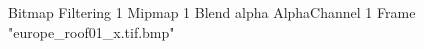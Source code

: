 {Bitmap
	{Filtering 1}
	{Mipmap 1}
	{Blend alpha}
	{AlphaChannel 1}
	{Frame "europe_roof01_x.tif.bmp"}
}
